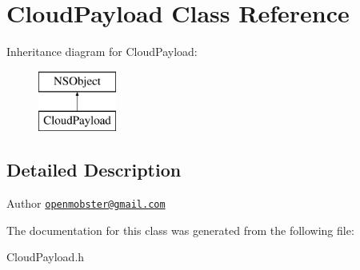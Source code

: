 \hypertarget{interface_cloud_payload}{
\section{\-Cloud\-Payload \-Class \-Reference}
\label{interface_cloud_payload}
}
\-Inheritance diagram for \-Cloud\-Payload\-:\begin{figure}[H]
\begin{center}
\leavevmode
\includegraphics[height=2.000000cm]{interface_cloud_payload}
\end{center}
\end{figure}


\subsection{\-Detailed \-Description}
\begin{DoxyAuthor}{\-Author}
\href{mailto:openmobster@gmail.com}{\tt openmobster@gmail.\-com} 
\end{DoxyAuthor}


\-The documentation for this class was generated from the following file\-:\begin{DoxyCompactItemize}
\item 
\-Cloud\-Payload.\-h\end{DoxyCompactItemize}
